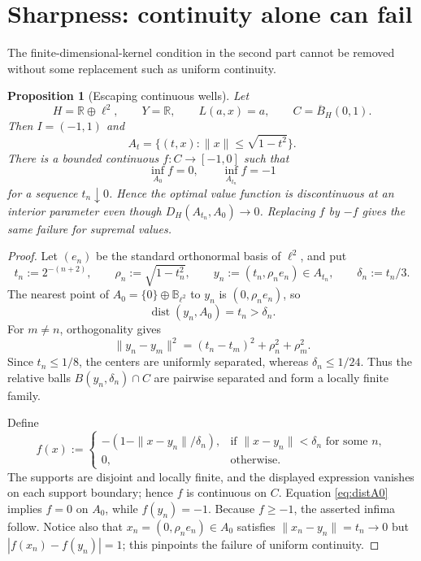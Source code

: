 \documentclass[11pt]{article}
\newcommand{\R}{\mathbb R}
\newcommand{\B}{\mathbb B}
\newcommand{\dist}{\operatorname{dist}}
\newtheorem{proposition}{Proposition}
\begin{document}
\section{Sharpness: continuity alone can fail}

The finite-dimensional-kernel condition in the second part cannot be removed
without some replacement such as uniform continuity.

\begin{proposition}[Escaping continuous wells]\label{prop:counterexample}
Let
\[
 H=\R\oplus\ell^2,\qquad Y=\R,\qquad L(a,x)=a,
 \qquad C=\overline B_H(0,1).
\]
Then $I=(-1,1)$ and
\[
 A_t=\{(t,x):\|x\|\le\sqrt{1-t^2}\}.
\]
There is a bounded continuous $f:C\to[-1,0]$ such that
\[
 \inf_{A_0}f=0,
 \qquad
 \inf_{A_{t_n}}f=-1
\]
for a sequence $t_n\downarrow0$.  Hence the optimal value function is
discontinuous at an interior parameter even though
$D_H(A_{t_n},A_0)\to0$.  Replacing $f$ by $-f$ gives the same failure
for supremal values.
\end{proposition}

\begin{proof}
Let $(e_n)$ be the standard orthonormal basis of $\ell^2$, and put
\[
 t_n:=2^{-(n+2)},\qquad
 \rho_n:=\sqrt{1-t_n^2},\qquad
 y_n:=(t_n,\rho_ne_n)\in A_{t_n},\qquad
 \delta_n:=t_n/3.
\]
The nearest point of $A_0=\{0\}\oplus\B_{\ell^2}$ to $y_n$ is
$(0,\rho_ne_n)$, so
\begin{equation}\label{eq:distA0}
 \dist(y_n,A_0)=t_n>\delta_n.
\end{equation}
For $m\ne n$, orthogonality gives
\[
 \|y_n-y_m\|^2=(t_n-t_m)^2+\rho_n^2+\rho_m^2.
\]
Since $t_n\le1/8$, the centers are uniformly separated, whereas
$\delta_n\le1/24$.  Thus the relative balls
$B(y_n,\delta_n)\cap C$ are pairwise separated and form a locally finite
family.

Define
\begin{equation}\label{eq:bump}
 f(x):=
 \begin{cases}
 -\left(1-\|x-y_n\|/\delta_n\right),
   &\text{if }\|x-y_n\|<\delta_n\text{ for some }n,\\
 0,&\text{otherwise.}
 \end{cases}
\end{equation}
The supports are disjoint and locally finite, and the displayed expression
vanishes on each support boundary; hence $f$ is continuous on $C$.
Equation \eqref{eq:distA0} implies $f=0$ on $A_0$, while
$f(y_n)=-1$.  Because $f\ge-1$, the asserted infima follow.  Notice also
that $x_n=(0,\rho_ne_n)\in A_0$ satisfies
$\|x_n-y_n\|=t_n\to0$ but
$|f(x_n)-f(y_n)|=1$; this pinpoints the failure of uniform continuity.
\end{proof}
\end{document}

